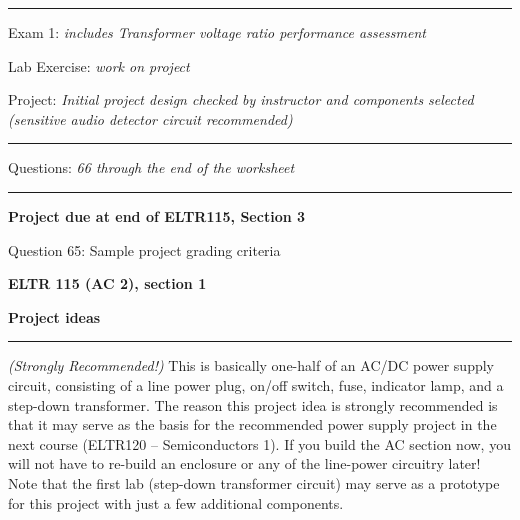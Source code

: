 
\vskip 10pt
\hrule \vskip 5pt
\noindent
{}

\hskip 10pt Exam 1: {\it includes Transformer voltage ratio performance assessment}
 
\hskip 10pt Lab Exercise: {\it work on project}
 
\hskip 10pt Project: {\it Initial project design checked by instructor and components selected (sensitive audio detector circuit recommended)}
  
\vskip 10pt
\hrule \vskip 5pt
\noindent
{}

\hskip 10pt Questions: {\it 66 through the end of the worksheet}
 
\vskip 10pt
\hrule \vskip 5pt
\noindent
{}

\hskip 10pt {\bf Project due at end of ELTR115, Section 3}
 
\hskip 10pt Question 65: Sample project grading criteria
 
\vskip 10pt










\vfil \eject

\centerline{\bf ELTR 115 (AC 2), section 1} \bigskip 
 
\vskip 10pt

\noindent
{\bf Project ideas}

\vskip 5pt

\hrule \vskip 5pt

\vskip 10pt

\noindent
{} {\it (Strongly Recommended!)}  This is basically one-half of an AC/DC power supply circuit, consisting of a line power plug, on/off switch, fuse, indicator lamp, and a step-down transformer.  The reason this project idea is strongly recommended is that it may serve as the basis for the recommended power supply project in the next course (ELTR120 -- Semiconductors 1).  If you build the AC section now, you will not have to re-build an enclosure or any of the line-power circuitry later!  Note that the first lab (step-down transformer circuit) may serve as a prototype for this project with just a few additional components.

